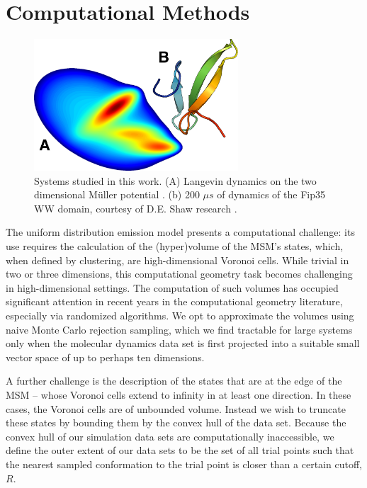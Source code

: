 \documentclass[journal=jpcbfk, layout=traditional, manuscript=article]{achemso}
\begin{document}
\section{Computational Methods}

\begin{figure}
\centering
\includegraphics[width=3in]{figs_final/mull_ww.png}
\caption{Systems studied in this work. (A) Langevin dynamics on the two dimensional M\"{u}ller potential \cite{Muller1980Reaction}. (b) 200 $\mu s$ of dynamics of the Fip35 WW domain\cite{Liu2008Experimental}, courtesy of D.E. Shaw research \cite{Shaw2010Atomic}.}
\end{figure}

The uniform distribution emission model presents a computational challenge: its use requires the calculation of the (hyper)volume of the MSM's states, which, when defined by clustering, are high-dimensional Voronoi cells. While trivial in two or three dimensions, this computational geometry task becomes challenging in high-dimensional settings. The computation of such volumes has occupied significant attention in recent years in the computational geometry literature, especially via randomized algorithms\cite{Kannan97, Simonovits03, Lovasz03}. We opt to approximate the volumes using naive Monte Carlo rejection sampling, which we find tractable for large systems only when the molecular dynamics data set is first projected into a suitable small vector space of up to perhaps ten dimensions.

A further challenge is the description of the states that are at the edge of the MSM -- whose Voronoi cells extend to infinity in at least one direction. In these cases, the Voronoi cells are of unbounded volume. Instead we wish to truncate these states by bounding them by the convex hull of the data set. Because the convex hull of our simulation data sets are computationally inaccessible, we define the outer extent of our data sets to be the set of all trial points such that the nearest sampled conformation to the trial point is closer than a certain cutoff, $R$.
\end{document}

